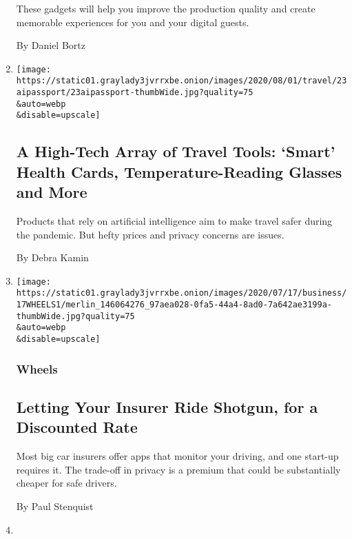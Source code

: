 \begin{enumerate}
  These gadgets will help you improve the production quality and create
  memorable experiences for you and your digital guests.

  By Daniel Bortz
\item
  \href{/2020/07/23/travel/artificial-intelligence-coronavirus-passport.html}{}

  \texttt{[image: https://static01.graylady3jvrrxbe.onion/images/2020/08/01/travel/23aipassport/23aipassport-thumbWide.jpg?quality=75\\\&auto=webp\\\&disable=upscale]}

  \hypertarget{a-high-tech-array-of-travel-tools-smart-health-cards-temperature-reading-glasses-and-more}{%
  \subsection{A High-Tech Array of Travel Tools: `Smart' Health Cards,
  Temperature-Reading Glasses and
  More}\label{a-high-tech-array-of-travel-tools-smart-health-cards-temperature-reading-glasses-and-more}}

  Products that rely on artificial intelligence aim to make travel safer
  during the pandemic. But hefty prices and privacy concerns are issues.

  By Debra Kamin
\item
  \href{/2020/07/16/business/car-insurance-app-discounts.html}{}

  \texttt{[image: https://static01.graylady3jvrrxbe.onion/images/2020/07/17/business/17WHEELS1/merlin\_146064276\_97aea028-0fa5-44a4-8ad0-7a642ae3199a-thumbWide.jpg?quality=75\\\&auto=webp\\\&disable=upscale]}

  \hypertarget{wheels}{%
  \subsubsection{Wheels}\label{wheels}}

  \hypertarget{letting-your-insurer-ride-shotgun-for-a-discounted-rate}{%
  \subsection{Letting Your Insurer Ride Shotgun, for a Discounted
  Rate}\label{letting-your-insurer-ride-shotgun-for-a-discounted-rate}}

  Most big car insurers offer apps that monitor your driving, and one
  start-up requires it. The trade-off in privacy is a premium that could
  be substantially cheaper for safe drivers.

  By Paul Stenquist
\item
  \href{/2020/07/14/style/assistive-technology.html}{}


\end{enumerate}
